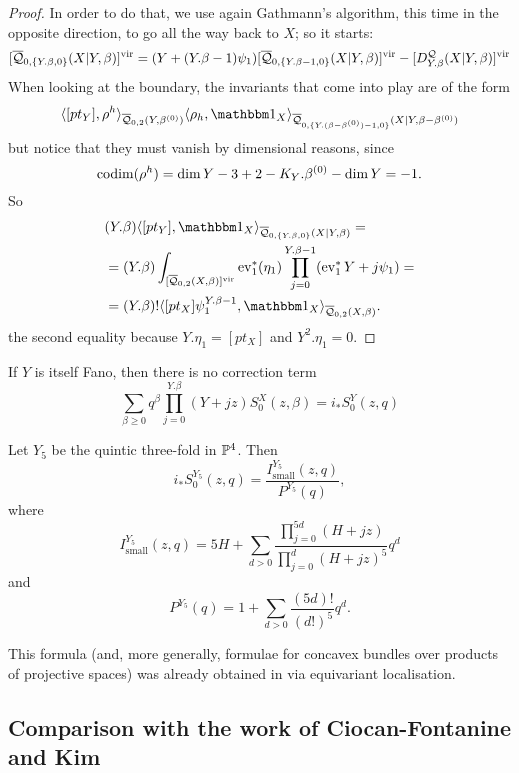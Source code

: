 \begin{proof}
In order to do that, we use again Gathmann's algorithm, this time in the opposite direction, to go all the way back to $X$; so it starts:
\[
 [\overline{\mathcal Q}_{0,\{Y.\beta,0\}}(X|Y,\beta)]^\text{vir}=(Y+(Y.\beta-1)\psi_1)[\overline{\mathcal Q}_{0,\{Y.\beta-1,0\}}(X|Y,\beta)]^\text{vir}-[D_{Y.\beta}^{\mathcal Q}(X|Y,\beta)]^\text{vir}
\]
When looking at the boundary, the invariants that come into play are of the form
\[
 \langle [pt_Y],\rho^h\rangle_{\Q{0}{2}{Y}{\beta^{(0)}}}\langle \rho_h,\mathbbm 1_{X}\rangle_{\Q{0}{\{Y.(\beta-\beta^{(0)})-1,0\}}{X|Y}{\beta-\beta^{(0)}}}
\]
but notice that they must vanish by dimensional reasons, since
\[
 \operatorname{codim}(\rho^h)=\dim Y-3+2-K_Y.\beta^{(0)}-\dim Y=-1.
\]
So
\begin{align*}
 & (Y.\beta)\langle [pt_Y],\mathbbm 1_{X}\rangle_{\Q{0}{\{Y.\beta,0\}}{X|Y}{\beta}} = \\
 & = (Y.\beta)\int_{[\Q{0}{2}{X}{\beta}]^{\text{vir}}}\ev_1^*(\eta_1)\prod_{j=0}^{Y.\beta-1}(\ev_1^*Y+j\psi_1) = \\
 & = (Y.\beta)!\langle[pt_X]\psi_1^{Y.\beta-1},\mathbbm 1_X\rangle_{\Q{0}{2}{X}{\beta}}.
\end{align*}
the second equality because $Y.\eta_1=[pt_X]$ and $Y^2.\eta_1=0$.
\end{proof}

\begin{cor}
 If $Y$ is itself Fano, then there is no correction term
 \[
  \sum_{\beta\geq 0} q^\beta\prod_{j=0}^{Y.\beta}(Y+jz)S_0^X(z,\beta) = i_*S_0^Y(z,q)
 \]
\end{cor}

\begin{cor}
 Let $Y_5$ be the quintic three-fold in $\mathbb P^4$. Then
 \[
  i_*S_0^{Y_5}(z,q)=\frac{I_{\text{small}}^{Y_5}(z,q)}{P^{Y_5}(q)},
 \]
where
\[
 I_{\text{small}}^{Y_5}(z,q)=5H+\sum_{d>0}\frac{\prod_{j=0}^{5d}(H+jz)}{\prod_{j=0}^{d}(H+jz)^5}q^d
\]
and
\[
 P^{Y_5}(q)=1+\sum_{d>0}\frac{(5d)!}{(d!)^5}q^d.
\]
\end{cor}

\begin{remark}
 This formula (and, more generally, formulae for concavex bundles over products of projective spaces) was already obtained in \cite[Theorem 1]{CZ-mirror} via equivariant localisation.
\end{remark}

\subsection{Comparison with the work of Ciocan-Fontanine and Kim}

